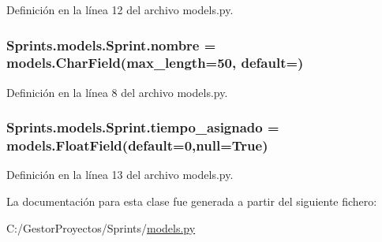 Definición en la línea 12 del archivo models.\+py.

\subsubsection[{\texorpdfstring{nombre}{nombre}}]{\setlength{\rightskip}{0pt plus 5cm}Sprints.\+models.\+Sprint.\+nombre = models.\+Char\+Field(max\+\_\+length=50, default=\textquotesingle{}\textquotesingle{})\hspace{0.3cm}{\ttfamily [static]}}\hypertarget{class_sprints_1_1models_1_1_sprint_a69a53233e03770e3e83ce7a97736d7f1}{}\label{class_sprints_1_1models_1_1_sprint_a69a53233e03770e3e83ce7a97736d7f1}


Definición en la línea 8 del archivo models.\+py.

\subsubsection[{\texorpdfstring{tiempo\+\_\+asignado}{tiempo_asignado}}]{\setlength{\rightskip}{0pt plus 5cm}Sprints.\+models.\+Sprint.\+tiempo\+\_\+asignado = models.\+Float\+Field(default=0,null=True)\hspace{0.3cm}{\ttfamily [static]}}\hypertarget{class_sprints_1_1models_1_1_sprint_a666d4cc2bd3ba38f47babbc20ac61025}{}\label{class_sprints_1_1models_1_1_sprint_a666d4cc2bd3ba38f47babbc20ac61025}


Definición en la línea 13 del archivo models.\+py.



La documentación para esta clase fue generada a partir del siguiente fichero\+:\begin{DoxyCompactItemize}
\item 
C\+:/\+Gestor\+Proyectos/\+Sprints/\hyperlink{_sprints_2models_8py}{models.\+py}\end{DoxyCompactItemize}

